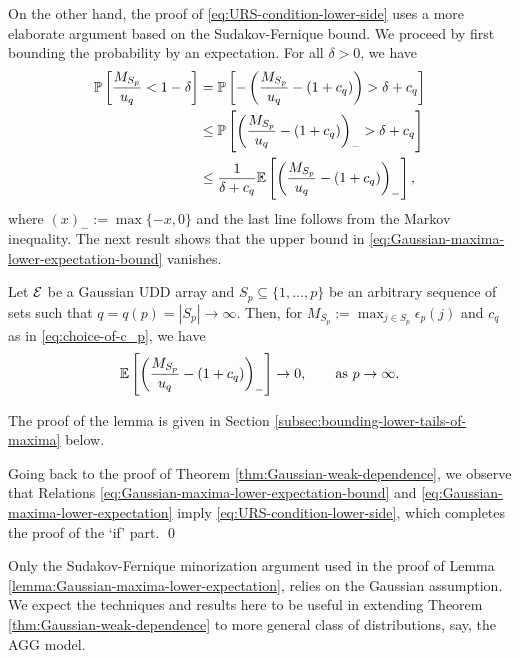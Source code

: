 On the other hand, the proof of \eqref{eq:URS-condition-lower-side} uses a more elaborate argument based on the Sudakov-Fernique bound.
We proceed by first bounding the probability by an expectation. 
For all $\delta>0$, we have
\begin{align}
    {\mathbb P}\left[\frac{M_{S_p}}{u_q}<1-\delta\right] 
        &= {\mathbb P}\left[-\left(\frac{M_{S_p}}{u_q} - (1+c_q)\right) > \delta + c_q\right] \nonumber \\
        &\le {\mathbb P}\left[\left(\frac{M_{S_p}}{u_q} - (1+c_q)\right)_->\delta+c_q\right] \nonumber \\
        &\le \frac{1}{\delta + c_q}{\mathbb E}\left[\left(\frac{M_{S_p}}{u_q} - (1+c_q)\right)_-\right], \label{eq:Gaussian-maxima-lower-expectation-bound}
\end{align}
where $(x)_-:=\max\{-x,0\}$ and the last line follows from the Markov inequality.
The next result shows that the upper bound in \eqref{eq:Gaussian-maxima-lower-expectation-bound} vanishes.
\begin{lemma} \label{lemma:Gaussian-maxima-lower-expectation}
  Let ${\cal E}$ be a Gaussian UDD  array  and 
  $S_p\subseteq\{1,\ldots,p\}$ be an arbitrary sequence of sets 
  such that $q = q(p) = |S_p|\to\infty$.  Then, for $M_{S_p}:= \max_{j\in S_p} \epsilon_p(j)$ and $c_q$ as in \eqref{eq:choice-of-c_p}, we have
  \begin{equation} \label{eq:Gaussian-maxima-lower-expectation}
    {\mathbb E}\left[\left(\frac{M_{S_p}}{u_q} - (1+c_q)\right)_-\right] \to 0,\ \ \quad \mbox{ as }p\to \infty.
  \end{equation}
\end{lemma}
The proof of the lemma is given in Section \ref{subsec:bounding-lower-tails-of-maxima} below.


Going back to the proof of Theorem \ref{thm:Gaussian-weak-dependence}, we observe that Relations \eqref{eq:Gaussian-maxima-lower-expectation-bound} and \eqref{eq:Gaussian-maxima-lower-expectation} imply \eqref{eq:URS-condition-lower-side}, which completes the proof of the `if' part. \qed 

\begin{remark} Only the Sudakov-Fernique minorization argument used in the proof of Lemma \ref{lemma:Gaussian-maxima-lower-expectation}, relies on the Gaussian assumption. We expect the techniques and results here to be useful in extending Theorem \ref{thm:Gaussian-weak-dependence} to more general class of distributions, say, the AGG model.
\end{remark}


